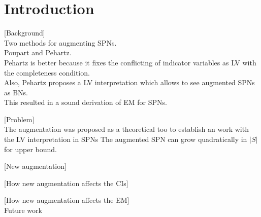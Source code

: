 \section{Introduction}

[Background]\\
Two methods for augmenting SPNs.\\
Poupart and Pehartz.\\
Pehartz is better because it fixes the conflicting of indicator variables as LV with the completeness condition.\\
Also, Pehartz proposes a LV interpretation which allows to see augmented SPNs as BNs.\\
This resulted in a sound derivation of EM for SPNs.


[Problem] \\
The augmentation was proposed as a theoretical too to establish an work with the LV interpretation in SPNs
The augmented SPN can grow quadratically in $|S|$ for upper bound.

[New augmentation]

[How new augmentation affects the CIs]

[How new augmentation affects the EM] \\
Future work